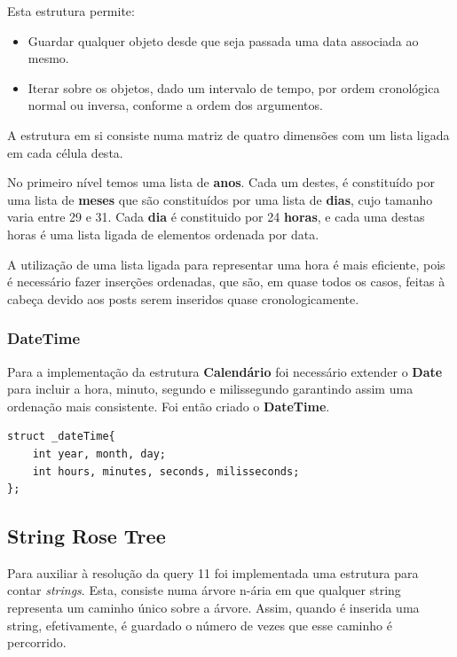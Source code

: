 \documentclass[10pt,a4paper]{article}
\begin{document}
        Esta estrutura permite:
        \begin{itemize}
                \item Guardar qualquer objeto desde que seja
                      passada uma data associada ao mesmo.
                \item Iterar sobre os objetos, dado um intervalo de tempo,
                      por ordem cronológica normal ou inversa, conforme a
                      ordem dos argumentos.
        \end{itemize}

        A estrutura em si consiste numa matriz de quatro dimensões com um lista
        ligada em cada célula desta.

        No primeiro nível temos uma lista de \textbf{anos}. Cada um destes,
        é constituído por uma lista de \textbf{meses} que são constituídos por
        uma lista de \textbf{dias}, cujo tamanho varia entre 29 e 31. Cada
        \textbf{dia} é constituido por 24 \textbf{horas}, e cada uma destas horas
        é uma lista ligada de elementos ordenada por data.

        A utilização de uma lista ligada para representar uma hora é mais
        eficiente, pois é necessário fazer inserções ordenadas, que são, em quase
        todos os casos, feitas à cabeça devido aos posts serem inseridos quase
        cronologicamente.

        \subsubsection{DateTime}
        Para a implementação da estrutura \textbf{Calendário} foi necessário
        extender o \textbf{Date} para incluir a hora, minuto, segundo e
        milissegundo garantindo assim uma ordenação mais consistente. Foi
        então criado o \textbf{DateTime}.
    \begin{verbatim}
struct _dateTime{
    int year, month, day;
    int hours, minutes, seconds, milisseconds;
};
    \end{verbatim}

    \subsection{String Rose Tree}
    \label{sec:str_rose_tree}
    Para auxiliar à resolução da query 11 foi implementada uma estrutura para
    contar \textit{strings}. Esta, consiste numa árvore n-ária em que qualquer
    string representa um caminho único sobre a árvore. Assim, quando é inserida
    uma string, efetivamente, é guardado o número de vezes que esse caminho é
    percorrido.
\end{document}
